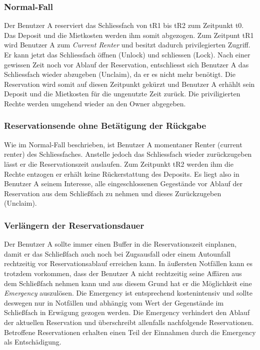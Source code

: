 \subsubsection{Normal-Fall}
Der Benutzer A reserviert das Schliessfach von tR1 bis tR2 zum Zeitpunkt t0. Das Deposit und die Mietkosten werden ihm somit abgezogen.
Zum Zeitpunt tR1 wird Benutzer A zum \emph{Current Renter} und besitzt dadurch privilegierten Zugriff. Er kann jetzt das Schliessfach öffnen (Unlock) und schliessen (Lock). Nach einer gewissen Zeit noch vor Ablauf der Reservation, entschliesst sich Benutzer A das Schliessfach wieder abzugeben (Unclaim), da er es nicht mehr benötigt. Die Reservation wird somit auf diesen Zeitpunkt gekürzt und Benutzer A erhählt sein Deposit und die Mietkosten für die ungenutzte Zeit zurück. Die priviligierten Rechte werden umgehend wieder an den Owner abgegeben.

\subsubsection{Reservationsende ohne Betätigung der Rückgabe}
Wie im Normal-Fall beschrieben, ist Benutzer A momentaner Renter (current renter) des Schliessfaches. Anstelle jedoch das Schliessfach wieder zurückzugeben lässt er die Reservationszeit auslaufen. Zum Zeitpunkt tR2 werden ihm die Rechte entzogen er erhält keine Rückerstattung des Deposits. Es liegt also in Benutzer A seinem Interesse, alle eingeschlossenen Gegestände vor Ablauf der Reservation aus dem Schließfach zu nehmen und dieses Zurückzugeben (Unclaim).

\subsubsection{Verlängern der Reservationsdauer}
Der Benutzer A sollte immer einen Buffer in die Reservationszeit einplanen, damit er das Schließfach auch noch bei Zugsausfall oder einem Autounfall rechtzeitig vor Reservationsablauf erreichen kann. In äußersten Notfällen kann es trotzdem vorkommen, dass der Benutzer A nicht rechtzeitig seine Affären aus dem Schließfach nehmen kann und aus diesem Grund hat er die Möglichkeit eine \emph{Emergency} auszulösen. Die Emergency ist entsprechend kostenintensiv und sollte deswegen nur in Notfällen und abhängig vom Wert der Gegenstände im Schließfach in Erwägung gezogen werden. 
Die Emergency verhindert den Ablauf der aktuellen Reservation und überschreibt allenfalls nachfolgende Reservationen. Betroffene Reservationen erhalten einen Teil der Einnahmen durch die Emergency als Entschädigung.

